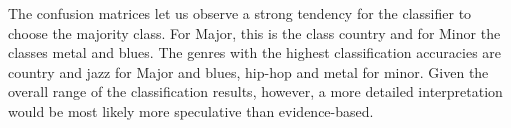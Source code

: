 \documentclass{article}
\begin{document}


The confusion matrices let us observe a strong tendency for the classifier to choose the majority class. For Major, this is the class country and for Minor the classes metal and blues. 
The genres with the highest classification  accuracies are country and jazz for Major and blues, hip-hop and metal for minor. 
Given the overall range of the classification results, however, a more detailed interpretation would be most likely more speculative than evidence-based.

\begin{table}
\begin{center}
    \caption{Confusion matrix, Major keys}
    \label{tab:confMatMajPC}
  \end{center}
\end{table}
\end{document}
